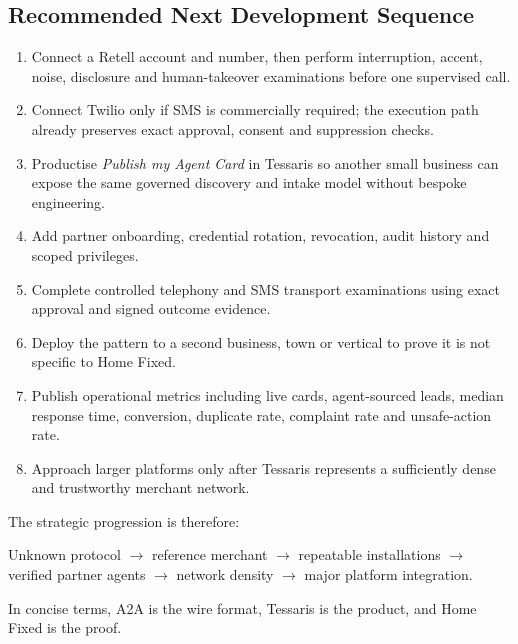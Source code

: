 \subsection{Recommended Next Development Sequence}

\begin{enumerate}
  \item Connect a Retell account and number, then perform interruption, accent, noise, disclosure and human-takeover examinations before one supervised call.
  \item Connect Twilio only if SMS is commercially required; the execution path already preserves exact approval, consent and suppression checks.
  \item Productise \emph{Publish my Agent Card} in Tessaris so another small business can expose the same governed discovery and intake model without bespoke engineering.
  \item Add partner onboarding, credential rotation, revocation, audit history and scoped privileges.
  \item Complete controlled telephony and SMS transport examinations using exact approval and signed outcome evidence.
  \item Deploy the pattern to a second business, town or vertical to prove it is not specific to Home Fixed.
  \item Publish operational metrics including live cards, agent-sourced leads, median response time, conversion, duplicate rate, complaint rate and unsafe-action rate.
  \item Approach larger platforms only after Tessaris represents a sufficiently dense and trustworthy merchant network.
\end{enumerate}

The strategic progression is therefore:

\begin{center}
Unknown protocol $\rightarrow$ reference merchant $\rightarrow$ repeatable installations $\rightarrow$ verified partner agents $\rightarrow$ network density $\rightarrow$ major platform integration.
\end{center}

In concise terms, A2A is the wire format, Tessaris is the product, and Home Fixed is the proof.
